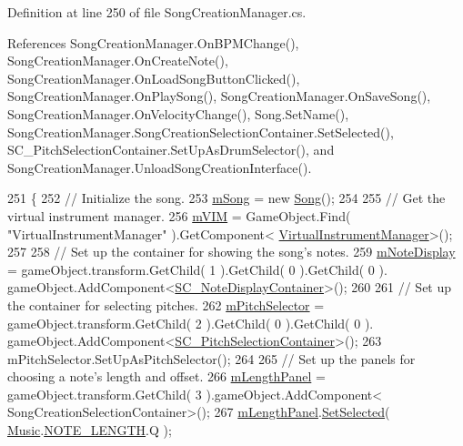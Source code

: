 Definition at line 250 of file Song\+Creation\+Manager.\+cs.



References Song\+Creation\+Manager.\+On\+B\+P\+M\+Change(), Song\+Creation\+Manager.\+On\+Create\+Note(), Song\+Creation\+Manager.\+On\+Load\+Song\+Button\+Clicked(), Song\+Creation\+Manager.\+On\+Play\+Song(), Song\+Creation\+Manager.\+On\+Save\+Song(), Song\+Creation\+Manager.\+On\+Velocity\+Change(), Song.\+Set\+Name(), Song\+Creation\+Manager.\+Song\+Creation\+Selection\+Container.\+Set\+Selected(), S\+C\+\_\+\+Pitch\+Selection\+Container.\+Set\+Up\+As\+Drum\+Selector(), and Song\+Creation\+Manager.\+Unload\+Song\+Creation\+Interface().


\begin{DoxyCode}
251     \{
252         \textcolor{comment}{// Initialize the song.}
253         \hyperlink{group___s_c_m_priv_var_gabd8329149faef65a689650d951a9abc9}{mSong} = \textcolor{keyword}{new} \hyperlink{class_song}{Song}();
254 
255         \textcolor{comment}{// Get the virtual instrument manager.}
256         \hyperlink{group___s_c_m_priv_var_ga7822ac42d20a4577db66808f000decfb}{mVIM} = GameObject.Find( \textcolor{stringliteral}{"VirtualInstrumentManager"} ).GetComponent<
      \hyperlink{class_virtual_instrument_manager}{VirtualInstrumentManager}>();
257 
258         \textcolor{comment}{// Set up the container for showing the song's notes.}
259         \hyperlink{group___s_c_m_priv_var_ga308f19d1b2020fc625c12dd08ee16b1c}{mNoteDisplay} = gameObject.transform.GetChild( 1 ).GetChild( 0 ).GetChild( 0 ).
      gameObject.AddComponent<\hyperlink{class_s_c___note_display_container}{SC\_NoteDisplayContainer}>();
260 
261         \textcolor{comment}{// Set up the container for selecting pitches.}
262         \hyperlink{group___s_c_m_priv_var_gab84821120cace4099edfb42c52d2af63}{mPitchSelector} = gameObject.transform.GetChild( 2 ).GetChild( 0 ).GetChild( 0 ).
      gameObject.AddComponent<\hyperlink{class_s_c___pitch_selection_container}{SC\_PitchSelectionContainer}>();
263         mPitchSelector.SetUpAsPitchSelector();
264 
265         \textcolor{comment}{// Set up the panels for choosing a note's length and offset.}
266         \hyperlink{group___s_c_m_priv_var_gadb8dedf80fbe474a1c94cdc95d088a6f}{mLengthPanel} = gameObject.transform.GetChild( 3 ).gameObject.AddComponent<
      SongCreationSelectionContainer>();
267         \hyperlink{group___s_c_m_priv_var_gadb8dedf80fbe474a1c94cdc95d088a6f}{mLengthPanel}.\hyperlink{group___s_c_m_nest_class_ab3d74be007528e4e6686f89e8e993b3b}{SetSelected}( \hyperlink{class_music}{Music}.\hyperlink{group___music_enums_gaf11b5f079adbb21c800b9eca1c5c3cbd}{NOTE\_LENGTH}.Q );

\end{DoxyCode}
